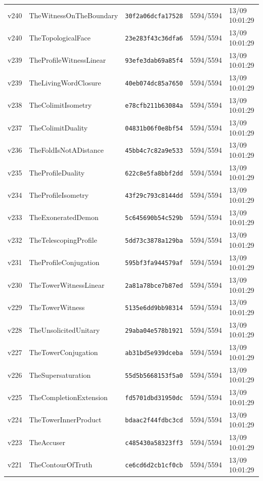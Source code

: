 \documentclass[11pt]{article}
\theoremstyle{definition}\newtheorem{deriv}{Derivation}
\begin{document}
{\begin{longtable}{@{}lllll@{}}
v240 & TheWitnessOnTheBoundary & \texttt{30f2a06dcfa17528} & 5594/5594 & 13/09 10:01:29 \\
v240 & TheTopologicalFace & \texttt{23e283f43c36dfa6} & 5594/5594 & 13/09 10:01:29 \\
v239 & TheProfileWitnessLinear & \texttt{93efe3dab69a85f4} & 5594/5594 & 13/09 10:01:29 \\
v239 & TheLivingWordClosure & \texttt{40eb074dc85a7650} & 5594/5594 & 13/09 10:01:29 \\
v238 & TheColimitIsometry & \texttt{e78cfb211b63084a} & 5594/5594 & 13/09 10:01:29 \\
v237 & TheColimitDuality & \texttt{04831b06f0e8bf54} & 5594/5594 & 13/09 10:01:29 \\
v236 & TheFoldIsNotADistance & \texttt{45bb4c7c82a9e533} & 5594/5594 & 13/09 10:01:29 \\
v235 & TheProfileDuality & \texttt{622c8e5fa8bbf2dd} & 5594/5594 & 13/09 10:01:29 \\
v234 & TheProfileIsometry & \texttt{43f29c793c8144dd} & 5594/5594 & 13/09 10:01:29 \\
v233 & TheExoneratedDemon & \texttt{5c645690b54c529b} & 5594/5594 & 13/09 10:01:29 \\
v232 & TheTelescopingProfile & \texttt{5dd73c3878a129ba} & 5594/5594 & 13/09 10:01:29 \\
v231 & TheProfileConjugation & \texttt{595bf3fa944579af} & 5594/5594 & 13/09 10:01:29 \\
v230 & TheTowerWitnessLinear & \texttt{2a81a78bce7b87ed} & 5594/5594 & 13/09 10:01:29 \\
v229 & TheTowerWitness & \texttt{5135e6dd9bb98314} & 5594/5594 & 13/09 10:01:29 \\
v228 & TheUnsolicitedUnitary & \texttt{29aba04e578b1921} & 5594/5594 & 13/09 10:01:29 \\
v227 & TheTowerConjugation & \texttt{ab31bd5e939dceba} & 5594/5594 & 13/09 10:01:29 \\
v226 & TheSupersaturation & \texttt{55d5b5668153f5a0} & 5594/5594 & 13/09 10:01:29 \\
v225 & TheCompletionExtension & \texttt{fd5701dbd31950dc} & 5594/5594 & 13/09 10:01:29 \\
v224 & TheTowerInnerProduct & \texttt{bdaac2f44fdbc3cd} & 5594/5594 & 13/09 10:01:29 \\
v223 & TheAccuser & \texttt{c485430a58323ff3} & 5594/5594 & 13/09 10:01:29 \\
v221 & TheContourOfTruth & \texttt{ce6cd6d2cb1cf0cb} & 5594/5594 & 13/09 10:01:29 \\

\end{longtable}}
\end{document}
